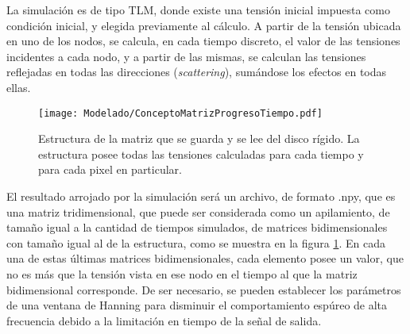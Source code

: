 La simulación es de tipo TLM, donde existe una tensión inicial impuesta como condición inicial, y elegida previamente al cálculo. A partir de la tensión ubicada en uno de los nodos, se calcula, en cada tiempo discreto, el valor de las tensiones incidentes a cada nodo, y a partir de las mismas, se calculan las tensiones reflejadas en todas las direcciones (\textit{scattering}), sumándose los efectos en todas ellas.

\begin{figure}[h]
	\centering
	\texttt{[image: Modelado/ConceptoMatrizProgresoTiempo.pdf]}
	\caption{Estructura de la matriz que se guarda y se lee del disco rígido. La estructura posee todas las tensiones calculadas para cada tiempo y para cada pixel en particular.}
	\label{fig:EstructuraTiemposMatrizNumpy}
\end{figure}

El resultado arrojado por la simulación será un archivo, de formato .npy, que es una matriz tridimensional, que puede ser considerada como un apilamiento, de tamaño igual a la cantidad de tiempos simulados, de matrices bidimensionales con tamaño igual al de la estructura, como se muestra en la figura \ref{fig:EstructuraTiemposMatrizNumpy}. En cada una de estas últimas matrices bidimensionales, cada elemento posee un valor, que no es más que la tensión vista en ese nodo en el tiempo al que la matriz bidimensional corresponde. De ser necesario, se pueden establecer los parámetros de una ventana de Hanning para disminuir el comportamiento espúreo de alta frecuencia debido a la limitación en tiempo de la señal de salida.